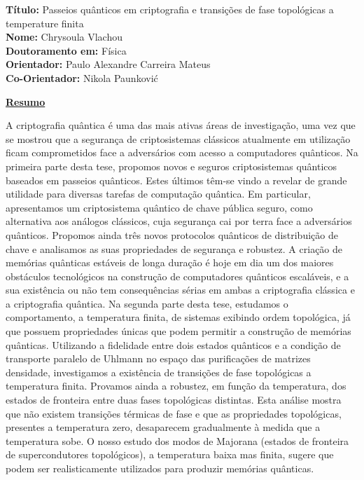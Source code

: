 \documentclass[12pt]{report}
\begin{document}
	


\noindent \textbf{T\'{i}tulo:} Passeios qu\^{a}nticos em criptografia e transi\c{c}\~{o}es de fase topol\'{o}gicas a temperature finita\\
\textbf{Nome:} Chrysoula Vlachou\\
\textbf{Doutoramento em:} F\'{i}sica\\
\textbf{Orientador:} Paulo Alexandre Carreira Mateus\\
\textbf{Co-Orientador:} Nikola Paunkovi\'c\\
\vspace{2\baselineskip}

\underline{\textbf{Resumo}}\\

A criptografia qu\^{a}ntica \'{e} uma das mais ativas \'{a}reas de investiga\c{c}\~{a}o, uma vez que se mostrou que a segurança de criptosistemas cl\'{a}ssicos atualmente em utiliza\c{c}\~{a}o ficam comprometidos face a advers\'{a}rios com acesso a computadores qu\^{a}nticos. Na primeira parte desta tese, propomos novos e seguros criptosistemas qu\^{a}nticos baseados em passeios qu\^{a}nticos. Estes \'{u}ltimos t\^{e}m-se vindo a revelar de grande utilidade para diversas tarefas de computa\c{c}\~{a}o qu\^{a}ntica. Em particular, apresentamos um criptosistema qu\^{a}ntico de chave p\'{u}blica seguro, como alternativa aos an\'{a}logos cl\'{a}ssicos, cuja seguran\c{c}a cai por terra face a advers\'{a}rios qu\^{a}nticos. Propomos ainda tr\^{e}s novos protocolos qu\^{a}nticos de distribui\c{c}\~{a}o de chave e analisamos as suas propriedades de seguran\c{c}a e robustez.
A cria\c{c}\~{a}o de mem\'{o}rias qu\^{a}nticas est\'{a}veis de longa dura\c{c}\~{a}o é hoje em dia um dos maiores obst\'{a}culos tecnol\'{o}gicos na constru\c{c}\~{a}o de computadores qu\^{a}nticos escal\'{a}veis, e a sua exist\^{e}ncia ou n\~{a}o tem consequ\^{e}ncias s\'{e}rias em ambas a criptografia cl\'{a}ssica e a criptografia qu\^{a}ntica. Na segunda parte desta tese, estudamos o comportamento, a temperatura finita, de sistemas exibindo ordem topol\'{o}gica, j\'{a} que possuem propriedades \'{u}nicas que podem permitir a constru\c{c}\~{a}o de mem\'{o}rias qu\^{a}nticas. Utilizando a fidelidade entre dois estados qu\^{a}nticos e a condi\c{c}\~{a}o de transporte paralelo de Uhlmann no espa\c{c}o das purifica\c{c}\~{o}es de matrizes densidade, investigamos a exist\^{e}ncia de transi\c{c}\~{o}es de fase topol\'{o}gicas a temperatura finita. Provamos ainda a robustez, em fun\c{c}\~{a}o da temperatura, dos estados de fronteira entre duas fases topol\'{o}gicas distintas. Esta an\'{a}lise mostra que n\~{a}o existem transi\c{c}\~{o}es t\'{e}rmicas de fase e que as propriedades topol\'{o}gicas, presentes a temperatura zero, desaparecem gradualmente \`{a} medida que a temperatura sobe. O nosso estudo dos modos de Majorana (estados de fronteira de supercondutores topol\'{o}gicos), a temperatura baixa mas finita, sugere que podem ser realisticamente utilizados para produzir mem\'{o}rias qu\^{a}nticas.
\end{document}
